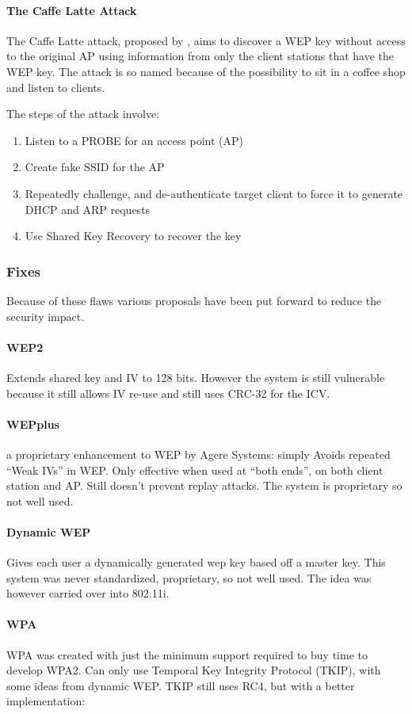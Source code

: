 \documentclass[pdftex, 12pt, a4paper]{article}
\begin{document}
\paragraph{The Caffe Latte Attack}
The Caffe Latte attack, proposed by \textcite{cafe}, aims to discover a WEP key without access to the original AP using information from only the client stations that have the WEP key. The attack is so named because of the possibility to sit in a coffee shop and listen to clients.

The steps of the attack involve:
\begin{enumerate}
    \item Listen to a PROBE for an access point (AP)
    \item Create fake SSID for the AP
    \item Repeatedly challenge, and de-authenticate target client to force it to generate DHCP and ARP requests
    \item Use Shared Key Recovery to recover the key
\end{enumerate}

\subsubsection{Fixes}
Because of these flaws various proposals have been put forward to reduce the security impact.
\paragraph{WEP2}
Extends shared key and IV to 128 bits. However the system is still vulnerable because it still allows IV re-use and still uses CRC-32 for the ICV.
\paragraph{WEPplus} a proprietary enhancement to WEP by Agere Systems: simply Avoids repeated ``Weak IVs'' in WEP.  Only effective when used at ``both ends'', on both client station and AP. Still doesn't prevent replay attacks.
The system is proprietary so not well used.
\paragraph{Dynamic WEP}
Gives each user a dynamically generated wep key based off a master key. This system was never standardized, proprietary, so not well used. The idea was however carried over into 802.11i.

\paragraph{WPA}
WPA was created with just the minimum support required to buy time to develop WPA2.  Can only use Temporal Key Integrity Protocol (TKIP), with some ideas from dynamic WEP. TKIP still uses RC4, but with a better implementation:
\end{document}
